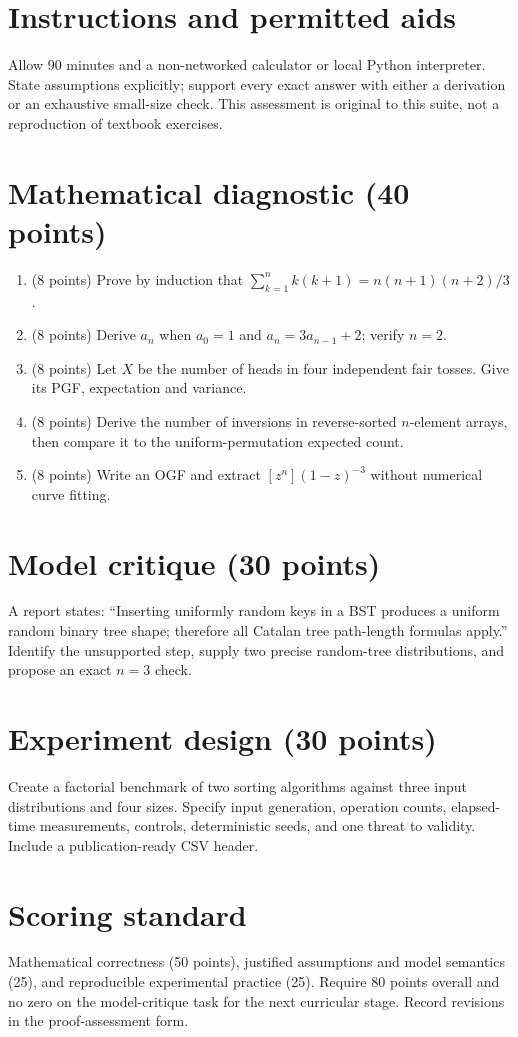 \documentclass[11pt]{article}
\begin{document}
\makedoctocpage

\section{Instructions and permitted aids}
Allow 90 minutes and a non-networked calculator or local Python interpreter. State assumptions explicitly; support every exact answer with either a derivation or an exhaustive small-size check. This assessment is original to this suite, not a reproduction of textbook exercises.
\section{Mathematical diagnostic (40 points)}
\begin{enumerate}
\item (8 points) Prove by induction that $\sum_{k=1}^n k(k+1)=n(n+1)(n+2)/3$.
\item (8 points) Derive $a_n$ when $a_0=1$ and $a_n=3a_{n-1}+2$; verify $n=2$.
\item (8 points) Let $X$ be the number of heads in four independent fair tosses. Give its PGF, expectation and variance.
\item (8 points) Derive the number of inversions in reverse-sorted $n$-element arrays, then compare it to the uniform-permutation expected count.
\item (8 points) Write an OGF and extract $[z^n](1-z)^{-3}$ without numerical curve fitting.
\end{enumerate}
\section{Model critique (30 points)}
A report states: ``Inserting uniformly random keys in a BST produces a uniform random binary tree shape; therefore all Catalan tree path-length formulas apply.'' Identify the unsupported step, supply two precise random-tree distributions, and propose an exact $n=3$ check.
\section{Experiment design (30 points)}
Create a factorial benchmark of two sorting algorithms against three input distributions and four sizes. Specify input generation, operation counts, elapsed-time measurements, controls, deterministic seeds, and one threat to validity. Include a publication-ready CSV header.
\section{Scoring standard}
Mathematical correctness (50 points), justified assumptions and model semantics (25), and reproducible experimental practice (25). Require 80 points overall and no zero on the model-critique task for the next curricular stage. Record revisions in the proof-assessment form.
\end{document}
